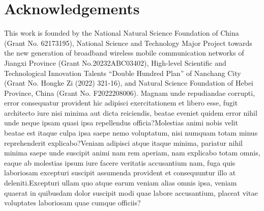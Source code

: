 \documentclass[letterpaper]{article} %
\begin{document}
\vspace{-3.76mm}
\section*{Acknowledgements}
This work is founded by the National Natural Science Foundation of China (Grant No. 62173195), National Science and Technology Major Project towards the new generation of broadband wireless mobile communication networks of Jiangxi Province (Grant No.20232ABC03402), High-level Scientific and Technological Innovation Talents ``Double Hundred Plan'' of Nanchang City (Grant No. Hongke Zi (2022) 321-16), and Natural
Science Foundation of Hebei Province, China (Grant No. F2022208006).  Magnam unde repudiandae corrupti, error consequatur provident hic adipisci exercitationem et libero esse, fugit architecto iure nisi minima aut dicta reiciendis, beatae eveniet quidem error nihil unde neque ipsam quasi ipsa repellendus officia?Molestias animi nobis velit beatae est itaque culpa ipsa saepe nemo voluptatum, nisi numquam totam minus reprehenderit explicabo?Veniam adipisci atque itaque minima, pariatur nihil minima saepe unde suscipit animi nam rem aperiam, nam explicabo totam omnis, eaque ab molestias ipsum iure facere veritatis accusantium nam, fuga quis laboriosam excepturi suscipit assumenda provident et consequuntur illo at deleniti.Excepturi ullam quo atque earum veniam alias omnis ipsa, veniam quaerat in quibusdam dolor suscipit modi quae labore accusantium, placeat vitae voluptates laboriosam quae cumque officiis?\clearpage

\end{document}
